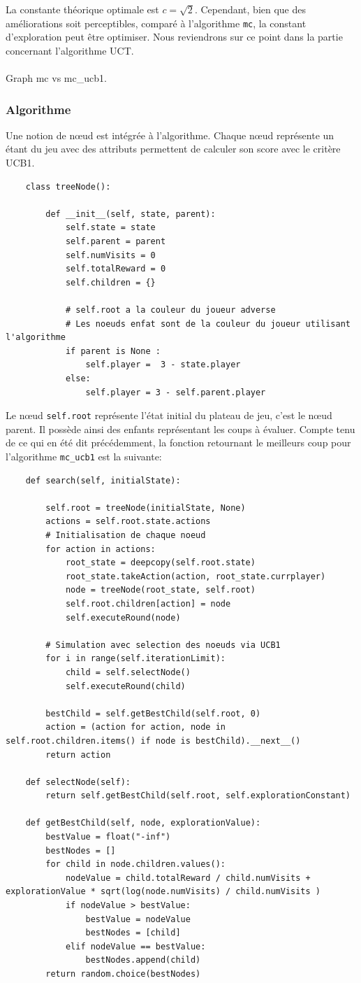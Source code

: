 \documentclass[a4paper]{article}
\theoremstyle{definition}
\begin{document}
La constante théorique optimale est $c=\sqrt{2}$. Cependant, bien que des améliorations soit perceptibles, comparé à l'algorithme \texttt{mc}, la constant d'exploration peut être optimiser. Nous reviendrons sur ce point dans la partie concernant l'algorithme UCT. \\ \\
 
Graph mc vs mc\_ucb1.

\subsubsection{Algorithme}

Une notion de nœud est intégrée à l'algorithme. Chaque nœud représente un étant du jeu avec des attributs permettent de calculer son score avec le critère UCB1.
\newpage
\begin{lstlisting}
	class treeNode():
	
		def __init__(self, state, parent):
			self.state = state
			self.parent = parent
			self.numVisits = 0
			self.totalReward = 0
			self.children = {}
			
			# self.root a la couleur du joueur adverse 
			# Les noeuds enfat sont de la couleur du joueur utilisant l'algorithme
			if parent is None : 
				self.player =  3 - state.player
			else:
				self.player = 3 - self.parent.player
\end{lstlisting}

Le nœud \texttt{self.root} représente l'état initial du plateau de jeu, c'est le nœud parent. Il possède ainsi des enfants représentant les coups à évaluer. Compte tenu de ce qui en été dit précédemment, la fonction retournant le meilleurs coup pour l'algorithme \texttt{mc\_ucb1} est la suivante:

\begin{lstlisting}
	def search(self, initialState):
	
		self.root = treeNode(initialState, None)
		actions = self.root.state.actions
		# Initialisation de chaque noeud
		for action in actions:
			root_state = deepcopy(self.root.state)
			root_state.takeAction(action, root_state.currplayer)
			node = treeNode(root_state, self.root)
			self.root.children[action] = node
			self.executeRound(node)
		
		# Simulation avec selection des noeuds via UCB1
		for i in range(self.iterationLimit):
			child = self.selectNode()
			self.executeRound(child)
		
		bestChild = self.getBestChild(self.root, 0)
		action = (action for action, node in self.root.children.items() if node is bestChild).__next__()
		return action
	
	def selectNode(self):
		return self.getBestChild(self.root, self.explorationConstant)
		
	def getBestChild(self, node, explorationValue):
		bestValue = float("-inf")
		bestNodes = []
		for child in node.children.values():
			nodeValue = child.totalReward / child.numVisits + explorationValue * sqrt(log(node.numVisits) / child.numVisits )
			if nodeValue > bestValue:
				bestValue = nodeValue
				bestNodes = [child]
			elif nodeValue == bestValue:
				bestNodes.append(child)
		return random.choice(bestNodes)
\end{lstlisting}
\end{document}
